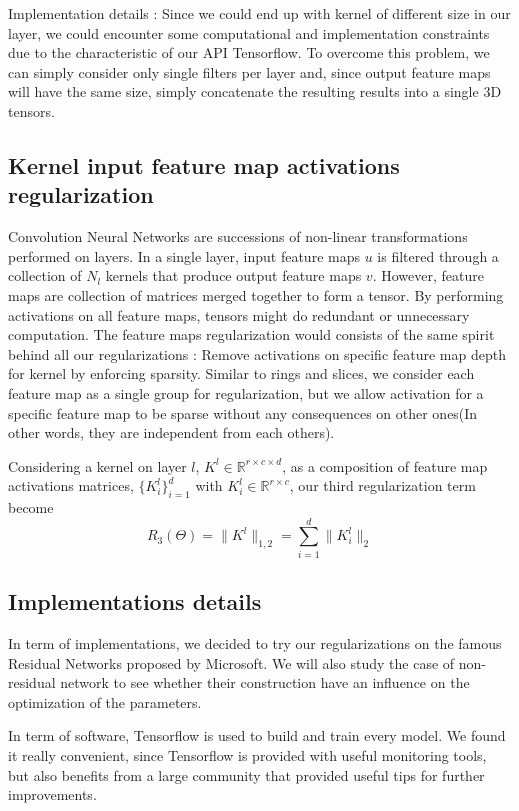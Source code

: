 \documentclass{winnower}
\begin{document}
Implementation details : Since we could end up with kernel of different size in our layer, we could encounter some computational and implementation constraints due to the characteristic of our API Tensorflow. To overcome this problem, we can simply consider only single filters per layer and, since output feature maps will have the same size, simply concatenate the resulting results into a single 3D tensors.

\subsection{Kernel input feature map activations regularization}
Convolution Neural Networks are successions of non-linear transformations performed on layers. In a single layer, input feature maps $u$ is filtered through a collection of $N_l$ kernels that produce output feature maps $v$. However, feature maps are collection of matrices merged together to form a tensor. By performing activations on all feature maps, tensors might do redundant or unnecessary computation. The feature maps regularization would consists of the same spirit behind all our regularizations : Remove activations on specific feature map depth for kernel by enforcing sparsity. Similar to rings and slices, we consider each feature map as a single group for regularization, but we allow activation for a specific feature map to be sparse without any consequences on other ones(In other words, they are independent from each others).

Considering a kernel on layer $l$, $K^l \in \mathbb{R}^{r \times c \times d}$, as a composition of feature map activations matrices, $\{ K^l_i \}_{i=1}^d $ with  $K^l_i \in \mathbb{R}^{r \times c}$, our third regularization term become 
\[
R_3(\Theta) = \|K^l\|_{1,2} = \sum_{i=1}^d \|K_i^l \|_2 
\]



\subsection{Implementations details}
In term of implementations, we decided to try our regularizations on the famous Residual Networks proposed by Microsoft. We will also study the case of non-residual network to see whether their construction have an influence on the optimization of the parameters.

In term of software, Tensorflow is used to build and train every model. We found it really convenient, since Tensorflow is provided with useful monitoring tools, but also benefits from a large community that provided useful tips for further improvements.





\end{document}
